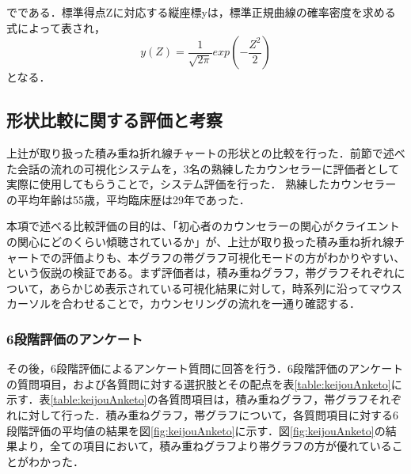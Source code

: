 \documentclass[shuuron]{kuee}
\begin{document}
でである．標準得点Zに対応する縦座標yは，標準正規曲線の確率密度を求める式によって表され，
\begin{equation}
  y(Z)=\frac{1}{\sqrt{2\pi}}exp(-\frac{Z^2}{2})
\end{equation}
となる．






\subsection{形状比較に関する評価と考察}
上辻\cite{uetsuji}が取り扱った積み重ね折れ線チャートの形状との比較を行った．前節で述べた会話の流れの可視化システムを，3名の熟練したカウンセラーに評価者として実際に使用してもらうことで，システム評価を行った．
熟練したカウンセラーの平均年齢は55歳，平均臨床歴は29年であった．

本項で述べる比較評価の目的は、「初心者のカウンセラーの関心がクライエントの関心にどのくらい傾聴されているか」が、上辻\cite{uetsuji}が取り扱った積み重ね折れ線チャートでの評価よりも、本グラフの帯グラフ可視化モードの方がわかりやすい、という仮説の検証である。まず評価者は，積み重ねグラフ，帯グラフそれぞれについて，あらかじめ表示されている可視化結果に対して，時系列に沿ってマウスカーソルを合わせることで，カウンセリングの流れを一通り確認する．

\subsubsection{6段階評価のアンケート}


その後，6段階評価によるアンケート質問に回答を行う．6段階評価のアンケートの質問項目，および各質問に対する選択肢とその配点を表\ref{table:keijouAnketo}に示す．表\ref{table:keijouAnketo}の各質問項目は，積み重ねグラフ，帯グラフそれぞれに対して行った．積み重ねグラフ，帯グラフについて，各質問項目に対する6段階評価の平均値の結果を図\ref{fig:keijouAnketo}に示す．図\ref{fig:keijouAnketo}の結果より，全ての項目において，積み重ねグラフより帯グラフの方が優れていることがわかった．
\end{document}
